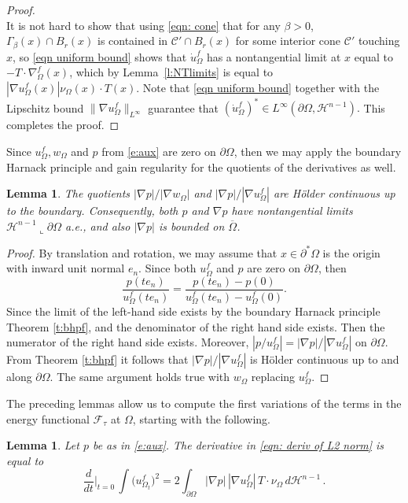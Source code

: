 \documentclass[10pt, reqno]{amsart}
\numberwithin{equation}{section}
\newtheorem{lemma}[theorem]{Lemma}
\def\W{\Omega}
\def\err{\tau}
\def\Ep{\mathcal{F}_{\err}}
\def\na{\nabla}
\begin{document}
\begin{proof}
\begin{equation}
\end{equation}
It is not hard to show that using \eqref{eqn: cone} that for any $\beta>0$, $\Gamma_\beta(x) \cap B_r(x)$ is contained in $\mathcal{C}'\cap B_r(x)$  for some interior cone $\mathcal{C}'$ touching $x$, so \eqref{eqn uniform bound} shows that  $\dot{u}_{\W}^f$ has a nontangential limit  at $x$ equal to $- T\cdot \nabla_\W^f(x)$, which by Lemma~\ref{l:NTlimits} is equal to $| \nabla u_\W^f(x)| \nu_\W(x)\cdot T(x)$. Note that \eqref{eqn uniform bound} together with the Lipschitz bound $\| \na u_\W^f\|_{L^\infty}$ guarantee that $(\dot{u}_{\W}^f)^* \in L^\infty(\partial \W, \mathcal{H}^{n-1}).$ This completes the proof.
\end{proof}


Since $u_{\W}^f, w_{\W}$ and $p$ from \eqref{e:aux} are zero on $\partial \W$, then we may apply the boundary Harnack principle and gain regularity for the quotients of the derivatives as well. 

\begin{lemma} \label{l:gradhigher}
 The quotients $|\nabla p|/|\nabla w_{\W}|$ and $|\nabla p|/|\nabla u_{\W}^f|$ are H\"older continuous up to the boundary. Consequently, both $p$ and $\nabla p$ have nontangential limits $\mathcal{H}^{n-1}\llcorner\partial \W$ a.e., and also $|\nabla p|$ is bounded on $\overline{\W}$. 
\end{lemma}

\begin{proof}
 By translation and rotation, we may assume that $x \in \partial^* \W$ is the origin with inward unit normal $e_n$. Since both $u_{\W}^f$ and $p$ are zero on $\partial \W$, then 
 \[
 \frac{p(te_n)}{u_{\W}^f(t e_n)} = \frac{p(te_n)-p(0)}{u_{\W}^f(t e_n) - u_{\W}^f(0)}. 
 \]
 Since the limit of the left-hand side exists by the boundary Harnack principle Theorem \ref{t:bhpf}, and the denominator of the right hand side exists. Then the numerator of the right hand side exists. Moreover, $|p/u_{\W}^f|=|\nabla p |/ |\nabla u_{\W}^f|$ on $\partial \W$. From Theorem \ref{t:bhpf} it follows that $|\nabla p |/ |\nabla u_{\W}^f|$ is H\"older continuous up to and along $\partial \W$. The same argument holds true with $w_\W$ replacing $u_{\W}^f$. 
\end{proof}



The preceding lemmas allow us to compute the first variations of the terms in the energy functional $\Ep$ at $\W$, starting with the following.
\begin{lemma}\label{lem: square variation} Let $p$ be as in \eqref{e:aux}. 
    The derivative in \eqref{eqn: deriv of L2 norm} is equal to
    \begin{equation}
        \label{eqn: first var f}
\frac{d}{dt}\Big|_{t=0}\, \int \big( u_{\Omega_t}^f\big)^2 = 2 \int_{\partial \W} |\na p|\, |\nabla u_\W^f| \, T\cdot \nu_\W \,d \mathcal{H}^{n-1}\,.
    \end{equation}
\end{lemma}
\end{document}
